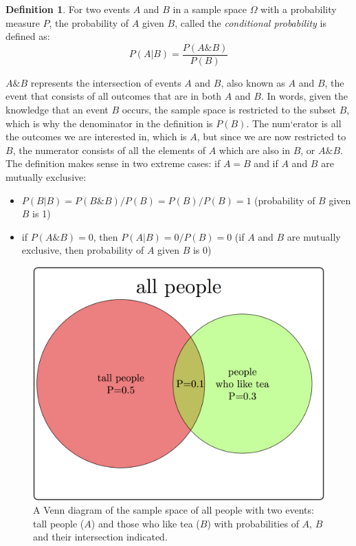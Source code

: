 \documentclass[
]{book}
\providecommand{\tightlist}{%
  \setlength{\itemsep}{0pt}\setlength{\parskip}{0pt}}
\theoremstyle{definition}
\newtheorem{definition}{Definition}[chapter]
\theoremstyle{definition}
\theoremstyle{definition}
\theoremstyle{remark}
\begin{document}
\begin{definition}
\protect\hypertarget{def:def-cond-prob}{}{\label{def:def-cond-prob} }For two events \(A\) and \(B\) in a sample space \(\Omega\) with a probability measure \(P\), the probability of \(A\) given \(B\), called the \emph{conditional probability} is defined as:
\[P(A|B) = \frac{P(A\& B)}{P(B)}\]
\end{definition}

\(A \& B\) represents the intersection of events \(A\) and \(B\), also known as \(A\) and \(B\), the event that consists of all outcomes that are in both \(A\) and \(B\). In words, given the knowledge that an event \(B\) occurs, the sample space is restricted to the subset \(B\), which is why the denominator in the definition is \(P(B)\). The num`erator is all the outcomes we are interested in, which is \(A\), but since we are now restricted to \(B\), the numerator consists of all the elements of \(A\) which are also in \(B\), or \(A \& B\). The definition makes sense in two extreme cases: if \(A = B\) and if \(A\) and \(B\) are mutually exclusive:

\begin{itemize}
\tightlist
\item
  \(P(B|B) = P(B \& B) /P(B) = P(B)/P(B) = 1\) (probability of \(B\) given \(B\) is 1)
\item
  if \(P(A\& B) =0\), then \(P(A|B) = 0/P(B) = 0\) (if \(A\) and \(B\) are mutually exclusive, then probability of \(A\) given \(B\) is 0)
\end{itemize}

\begin{figure}
\centering
\includegraphics{ch6/cond_prob_tikz.png}
\caption{A Venn diagram of the sample space of all people with two events: tall people (\(A\)) and those who like tea (\(B\)) with probabilities of \(A\), \(B\) and their intersection indicated.}
\end{figure}
\end{document}
